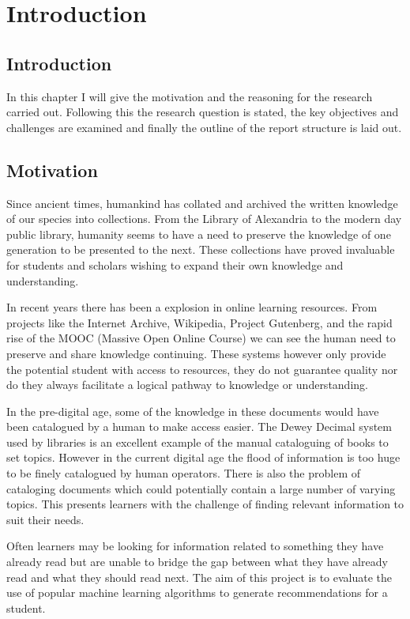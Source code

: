 \chapter{Introduction}

\section{Introduction}

In this chapter I will give the motivation and the reasoning for the research carried out.
Following this the research question is stated, the key objectives and challenges are examined and finally the outline of the report structure is laid out.

\section{Motivation}

Since ancient times, humankind has collated and archived the written knowledge of our species into collections.
From the Library of Alexandria to the modern day public library, humanity seems to have a need to preserve the knowledge of one generation to be presented to the next.
These collections have proved invaluable for students and scholars wishing to expand their own knowledge and understanding.

In recent years there has been a explosion in online learning resources.
From projects like the Internet Archive, Wikipedia, Project Gutenberg, and the rapid rise of the MOOC (Massive Open Online Course) we can see the human need to preserve and share knowledge continuing.
These systems however only provide the potential student with access to resources, they do not guarantee quality nor do they always facilitate a logical pathway to knowledge or understanding.

In the pre-digital age, some of the knowledge in these documents would have been catalogued by a human to make access easier.
The Dewey Decimal system used by libraries is an excellent example of the manual cataloguing of books to set topics.
However in the current digital age the flood of information is too huge to be finely catalogued by human operators.
There is also the problem of cataloging documents which could potentially contain a large number of varying topics.
This presents learners with the challenge of finding relevant information to suit their needs.

Often learners may be looking for information related to something they have already read but are unable to bridge the gap between what they have already read and what they should read next.
The aim of this project is to evaluate the use of popular machine learning algorithms to generate recommendations for a student.

